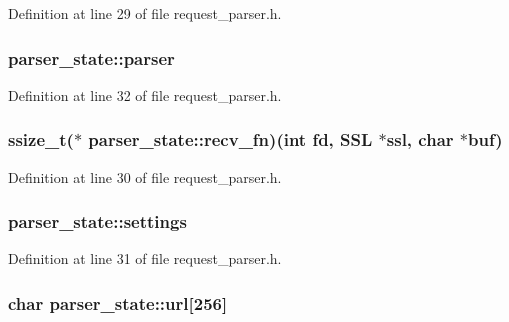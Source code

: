 Definition at line 29 of file request\-\_\-parser.\-h.

\hypertarget{structparser__state_aaf6745c9db055761cd8da5f0d5e76d04}{
\subsubsection[{parser}]{ parser\-\_\-state\-::parser}}\label{structparser__state_aaf6745c9db055761cd8da5f0d5e76d04}


Definition at line 32 of file request\-\_\-parser.\-h.

\hypertarget{structparser__state_ad02c5f0bb7a54a5be951120be343e767}{
\subsubsection[{recv\-\_\-fn}]{\setlength{\rightskip}{0pt plus 5cm}ssize\-\_\-t($\ast$ parser\-\_\-state\-::recv\-\_\-fn)(int fd, S\-S\-L $\ast$ssl, char $\ast$buf)}}\label{structparser__state_ad02c5f0bb7a54a5be951120be343e767}


Definition at line 30 of file request\-\_\-parser.\-h.

\hypertarget{structparser__state_a88886f7995880a05fd64c6ce943c4d2b}{
\subsubsection[{settings}]{ parser\-\_\-state\-::settings}}\label{structparser__state_a88886f7995880a05fd64c6ce943c4d2b}


Definition at line 31 of file request\-\_\-parser.\-h.

\hypertarget{structparser__state_a64222808a9174a17ae2d25cb7ab72383}{
\subsubsection[{url}]{\setlength{\rightskip}{0pt plus 5cm}char parser\-\_\-state\-::url\mbox{[}256\mbox{]}}}\label{structparser__state_a64222808a9174a17ae2d25cb7ab72383}



